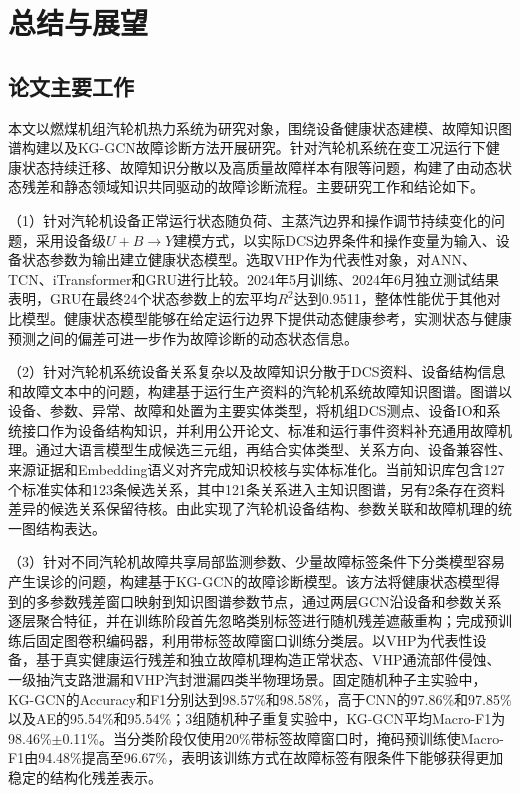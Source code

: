 \section{总结与展望}
\label{sec:conclusion}

\subsection{论文主要工作}

本文以燃煤机组汽轮机热力系统为研究对象，围绕设备健康状态建模、故障知识图谱构建以及KG-GCN故障诊断方法开展研究。针对汽轮机系统在变工况运行下健康状态持续迁移、故障知识分散以及高质量故障样本有限等问题，构建了由动态状态残差和静态领域知识共同驱动的故障诊断流程。主要研究工作和结论如下。

（1）针对汽轮机设备正常运行状态随负荷、主蒸汽边界和操作调节持续变化的问题，采用设备级$U+B\rightarrow Y$建模方式，以实际DCS边界条件和操作变量为输入、设备状态参数为输出建立健康状态模型。选取VHP作为代表性对象，对ANN、TCN、iTransformer和GRU进行比较。2024年5月训练、2024年6月独立测试结果表明，GRU在最终24个状态参数上的宏平均$R^2$达到0.9511，整体性能优于其他对比模型。健康状态模型能够在给定运行边界下提供动态健康参考，实测状态与健康预测之间的偏差可进一步作为故障诊断的动态状态信息。

（2）针对汽轮机系统设备关系复杂以及故障知识分散于DCS资料、设备结构信息和故障文本中的问题，构建基于运行生产资料的汽轮机系统故障知识图谱。图谱以设备、参数、异常、故障和处置为主要实体类型，将机组DCS测点、设备IO和系统接口作为设备结构知识，并利用公开论文、标准和运行事件资料补充通用故障机理。通过大语言模型生成候选三元组，再结合实体类型、关系方向、设备兼容性、来源证据和Embedding语义对齐完成知识校核与实体标准化。当前知识库包含127个标准实体和123条候选关系，其中121条关系进入主知识图谱，另有2条存在资料差异的候选关系保留待核。由此实现了汽轮机设备结构、参数关联和故障机理的统一图结构表达。

（3）针对不同汽轮机故障共享局部监测参数、少量故障标签条件下分类模型容易产生误诊的问题，构建基于KG-GCN的故障诊断模型。该方法将健康状态模型得到的多参数残差窗口映射到知识图谱参数节点，通过两层GCN沿设备和参数关系逐层聚合特征，并在训练阶段首先忽略类别标签进行随机残差遮蔽重构；完成预训练后固定图卷积编码器，利用带标签故障窗口训练分类层。以VHP为代表性设备，基于真实健康运行残差和独立故障机理构造正常状态、VHP通流部件侵蚀、一级抽汽支路泄漏和VHP汽封泄漏四类半物理场景。固定随机种子主实验中，KG-GCN的Accuracy和F1分别达到98.57\%和98.58\%，高于CNN的97.86\%和97.85\%以及AE的95.54\%和95.54\%；3组随机种子重复实验中，KG-GCN平均Macro-F1为98.46\%$\pm$0.11\%。当分类阶段仅使用20\%带标签故障窗口时，掩码预训练使Macro-F1由94.48\%提高至96.67\%，表明该训练方式在故障标签有限条件下能够获得更加稳定的结构化残差表示。

